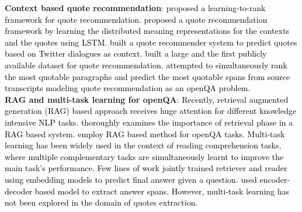 \noindent\textbf{Context based quote recommendation}:
\textcolor{black}{\citet{tan2015learning} proposed a learning-to-rank framework for quote recommendation. %
\citet{10.1145/2983323.2983788} proposed a quote recommendation framework by learning the distributed meaning representations for the contexts and the quotes using LSTM. \citet{lee} built a quote recommender system to predict quotes based on Twitter dialogues as context. 
\citet{quoteR} built a large and the first publicly available dataset for quote recommendation. \citet{maclaughlin2021context} attempted to simultaneously rank the most quotable paragraphs and predict the most quotable spans from source transcripts modeling quote recommendation as an openQA problem.}\\ 
\noindent\textbf{RAG and multi-task learning for openQA}: \textcolor{black}{Recently, retrieval augmented generation (RAG) based approach receives huge attention for different knowledge intensive NLP tasks. \citet{10.1145/3626772.3657834} thoroughly examines the importance of retrieval phase in a RAG based system. \citet{kim2024reragimprovingopendomainqa,nian2024wragweaklysuperviseddense} employ RAG based method for openQA tasks.  Multi-task learning has been widely used in the context of reading comprehension tasks, where multiple complementary tasks are simultaneously learnt to improve the main task's performance. Few lines of work \cite{10.1145/3269206.3271702, nandy-etal-2021-question-answering, wang-etal-2021-retrieval} jointly trained retriever and reader using embedding models to predict final answer given a question. \citet{kongyoung-etal-2022-monoqa} used encoder-decoder based model to extract answer spans. However, multi-task learning has not been explored in the domain of quotes extraction.}\\ 
